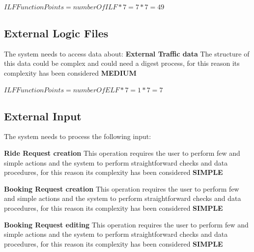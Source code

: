 \documentclass[11pt,titlepage]{article} %
\begin{document}
     \begin{center}
      $ ILF Function Points = numberOfILF * 7 = 7 * 7 = 49 $
     \end{center}

   \subsection{External Logic Files}
    The system needs to access data about:\newline\newline
    \textbf{External Traffic data}\newline
    The structure of this data could be complex and could need a digest process, for this reason its complexity has been considered \textbf{MEDIUM}\newline
    
    \begin{center}
     $ ILF Function Points = numberOfELF * 7 = 1 * 7 = 7 $
    \end{center}
    
    \subsection{External Input}
     The system needs to process the following input: \newline

      \noindent \textbf{Ride Request creation}\newline
      This operation requires the user to perform few and simple actions and the system to perform straightforward checks and data procedures,
      for this reason its complexity has been considered \textbf{SIMPLE}\newline\newline
      
      \noindent \textbf{Booking Request creation}\newline
      This operation requires the user to perform few and simple actions and the system to perform straightforward checks and data procedures,
      for this reason its complexity has been considered \textbf{SIMPLE}\newline\newline
      
      \noindent \textbf{Booking Request editing}\newline
      This operation requires the user to perform few and simple actions and the system to perform straightforward checks and data procedures,
      for this reason its complexity has been considered \textbf{SIMPLE}\newline\newline
      
\end{document}
